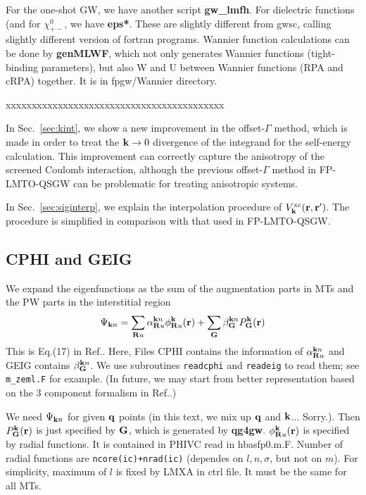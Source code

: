 \documentclass[a4paper,10pt,epsf,fleqn]{article}
\def\vxc{V^{\rm xc}}
\newcommand{\bfq}{{\bf q}}
\newcommand{\bfk}{{\bf k}}
\newcommand{\bfr}{{\bf r}}
\newcommand{\bfG}{{\bf G}}
\newcommand{\exe}[1]{{\bf #1}}
\newcommand{\io}[1]{{\sf  #1}}
\begin{document}
For the one-shot GW, we have another script \exe{gw\_lmfh}.
For dielectric functions (and for $\chi_{+-}^0$, we have \exe{eps*}.
These are slightly different from gwsc, calling
slightly different version of fortran programs.
Wannier function calculations can be done by \exe{genMLWF},
which not only generates Wannier functions (tight-binding parameters), 
but also W and U between Wannier functions (RPA and cRPA) together. 
It is in \io{fpgw/Wannier} directory.


xxxxxxxxxxxxxxxxxxxxxxxxxxxxxxxxxxxxxxxxxx


In Sec.~\ref{sec:kint}, we show a new improvement in the offset-$\Gamma$ method, which is
made in order to treat the $\bfk \to 0$ divergence of the integrand for the self-energy calculation.
This improvement can correctly capture the anisotropy of the screened Coulomb interaction,
although the previous offset-$\Gamma$ method in FP-LMTO-QSGW \cite{kotani_quasiparticle_2007}
can be problematic for treating anisotropic systems.

In Sec.~\ref{sec:siginterp}, we explain the interpolation procedure of 
$\vxc_\bfk(\bfr,\bfr')$. The procedure is simplified in comparison with that used in FP-LMTO-QSGW.






\subsection{CPHI and GEIG}
We expand the eigenfunctions as the sum of the augmentation parts in MTs and the PW parts in the interstitial region
\begin{eqnarray}
\Psi_{{\bf k}n} = \sum_{{\bf R}u}\alpha_{{\bf R}u}^{{\bf k}n}\phi_{{\bf R}u}^{\bf k}({\bf r}) + \sum_{\bf G}\beta_{\bf G}^{{\bf k}n}P_{\bf G}^{\bf k}({\bf r})
\end{eqnarray}
This is Eq.(17) in Ref.\cite{kotani_quasiparticle_2014}.
Here, Files \io{CPHI} contains the information of $\alpha_{{\bf R}u}^{{\bf k}n}$ and \io{GEIG} contains $\beta_{\bf G}^{{\bf k}n}$. 
We use subroutines \verb#readcphi# and \verb#readeig# to
read them; see \verb#m_zeml.F# for example.
(In future, we may start from better representation
based on the 3 component formalism in Ref.\cite{kotani2015pmt}.)

We need $\Psi_{{\bf k}n}$ for given $\bfq$ points 
(in this text, we mix up $\bfq$ and $\bfk$... Sorry.).
Then $P_{\bf G}^{\bf k}({\bf r})$ is just specified by 
$\bfG$, which is generated by \exe{qg4gw}.
$\phi_{{\bf R}u}^{\bf k}({\bf r})$ is specified by
radial functions. It is contained in \io{PHIVC} read in hbasfp0.m.F. Number of radial functions are
\verb#ncore(ic)+nrad(ic)# 
(dependes on $l,n,\sigma$, but not on $m$).
For simplicity, maximum of $l$ is fixed by LMXA in ctrl file.
It must be the same for all MTs.
\end{document}
